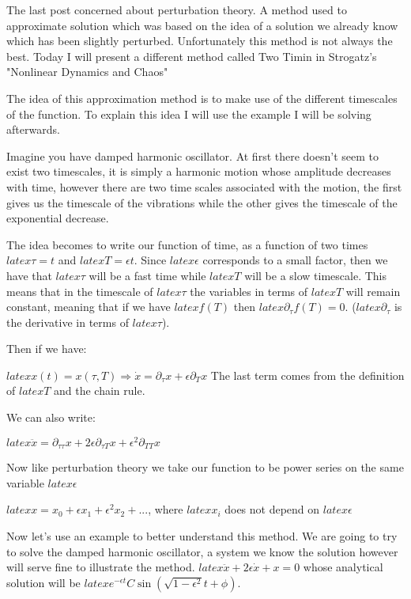 The last post concerned about perturbation theory. A method used to approximate solution which was based on the idea of a solution we already know which has been slightly perturbed. Unfortunately this method is not always the best. Today I will present a different method called Two Timin in Strogatz's "Nonlinear Dynamics and Chaos" 

The idea of this approximation method is to make use of the different timescales of the function. To explain this idea I will use the example I will be solving afterwards. 

Imagine you have damped harmonic oscillator. At first there doesn't seem to exist two timescales, it is simply a harmonic motion whose amplitude decreases with time, however there are two time scales associated with the motion, the first gives us the timescale of the vibrations while the other gives the timescale of the exponential decrease. 

The idea becomes to write our function of time, as a function of two times $latex \tau = t$ and $latex T = \epsilon t$. Since $latex \epsilon $ corresponds to a small factor, then we have that $latex \tau $ will be a fast time while $latex T $ will be a slow timescale. This means that in the timescale of $latex \tau $ the variables in terms of $latex T $ will remain constant, meaning that if we have $latex f(T) $ then $latex \partial_\tau f(T) = 0$. ($latex \partial_\tau $ is the derivative in terms of $latex \tau $). 

Then if we have: 

$latex x(t) = x(\tau, T) \Rightarrow \dot x = \partial_\tau x + \epsilon \partial_T x $ The last term comes from the definition of $latex T $ and the chain rule. 

We can also write: 

$latex \ddot x = \partial_{\tau \tau} x + 2\epsilon \partial_{\tau T} x+ \epsilon^2 \partial_{TT} x $ 

Now like perturbation theory we take our function to be  power series on the same variable $latex \epsilon $ 

$latex x = x_0 +  \epsilon x_1 + \epsilon^2 x_2 + ... $, where $latex x_i$ does not depend on $latex \epsilon$ 

Now let's use an example to better understand this method. We are going to try to solve the damped harmonic oscillator, a system we know the solution however will serve fine to illustrate the method. $latex \ddot x + 2\epsilon \dot x + x = 0$ whose analytical solution will be $latex e^{-\epsilon t} C\sin(\sqrt{1-\epsilon^2} t + \phi) $.

